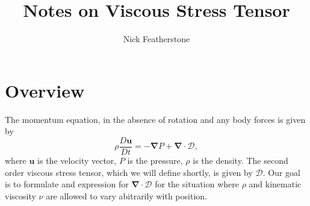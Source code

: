 \documentclass[10pt, letterpaper]{article}
\begin{document}


\renewcommand{\familydefault}{\sfdefault}


\renewcommand{\abstractname}{Overview}


\title{Notes on Viscous Stress Tensor}
\author{Nick Featherstone}
\date{}
\maketitle

\newcommand{\uvec}{\boldsymbol{u}}
\newcommand{\vgrad}{\boldsymbol{\nabla}}
\newcommand{\Dscript}{\boldsymbol{\mathcal{D}}}
\newcommand{\ebold}{\boldsymbol{e}}
\newcommand{\etwiddle}{\boldsymbol{\tilde{e}}}
\newcommand{\etwid}{\tilde{e}}
\newcommand{\sintheta}{\mathrm{sin}\theta}
\newcommand{\cottheta}{\mathrm{cot}\theta}
\newcommand{\csctheta}{\mathrm{csc}\theta}
\newcommand{\dvec}{\boldsymbol{d}}
\newcommand{\bvec}{\boldsymbol{b}}
\newcommand{\mvec}{\boldsymbol{m}}
\newcommand{\divu}{\vgrad\cdot\uvec}
\newcommand{\half}{\frac{1}{2}}
\newcommand{\third}{\frac{1}{3}}
\section{Overview}
The momentum equation, in the absence of rotation and any body forces is given by
\begin{equation}
\label{eq:momentum1}
\rho\frac{D\uvec}{Dt} = -\vgrad P +\vgrad\cdot\Dscript,
\end{equation}
where $\uvec$ is the velocity vector, $P$ is the pressure, $\rho$ is the density.  The second order viscous stress tensor, which we will define shortly, is given by $\Dscript$.   Our goal is to formulate and expression for $\vgrad\cdot\Dscript$ for the situation where $\rho$ and kinematic viscosity $\nu$ are allowed to vary abitrarily with position.
\end{document}
